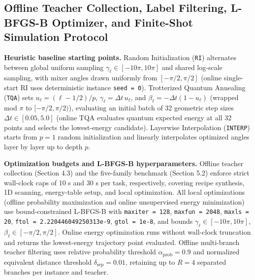 \documentclass{article}
\theoremstyle{plain}
\theoremstyle{definition}
\begin{document}
\subsection{Offline Teacher Collection, Label Filtering, L-BFGS-B Optimizer, and Finite-Shot Simulation Protocol}\label{subsec:b_2}

\textbf{Heuristic baseline starting points.} Random Initialization (\texttt{RI}) alternates between global uniform sampling $\gamma_\ell\in[-10\pi,10\pi]$ and shared log-scale sampling, with mixer angles drawn uniformly from $[-\pi/2,\pi/2]$ (online single-start RI uses deterministic instance \texttt{seed = 0}). Trotterized Quantum Annealing (\texttt{TQA}) sets $u_\ell=(\ell-1/2)/p$, $\gamma_\ell=\Delta t\,u_\ell$, and $\beta_\ell=-\Delta t(1-u_\ell)$ (wrapped mod $\pi$ to $[-\pi/2,\pi/2)$), evaluating an initial batch of 32 geometric step sizes $\Delta t\in[0.05, 5.0]$ (online TQA evaluates quantum expected energy at all 32 points and selects the lowest-energy candidate). Layerwise Interpolation (\texttt{INTERP}) starts from $p=1$ random initialization and linearly interpolates optimized angles layer by layer up to depth $p$.

\textbf{Optimization budgets and L-BFGS-B hyperparameters.} Offline teacher collection (Section 4.3) and the five-family benchmark (Section 5.2) enforce strict wall-clock caps of 10 s and 30 s per task, respectively, covering recipe synthesis, 1D scanning, energy-table setup, and local optimization. All local optimizations (offline probability maximization and online unsupervised energy minimization) use bound-constrained L-BFGS-B \citep{byrd1995limited} with \texttt{maxiter = 128}, \texttt{maxfun = 2048}, \texttt{maxls = 20}, \texttt{ftol = 2.220446049250313e-9}, \texttt{gtol = 1e-8}, and bounds $\gamma_\ell\in[-10\pi,10\pi]$, $\beta_\ell\in[-\pi/2,\pi/2]$. Online energy optimization runs without wall-clock truncation and returns the lowest-energy trajectory point evaluated. Offline multi-branch teacher filtering uses relative probability threshold $\alpha_{\mathrm{prob}}=0.9$ and normalized equivalent distance threshold $\delta_{\mathrm{sep}}=0.01$, retaining up to $R=4$ separated branches per instance and teacher.
\end{document}
